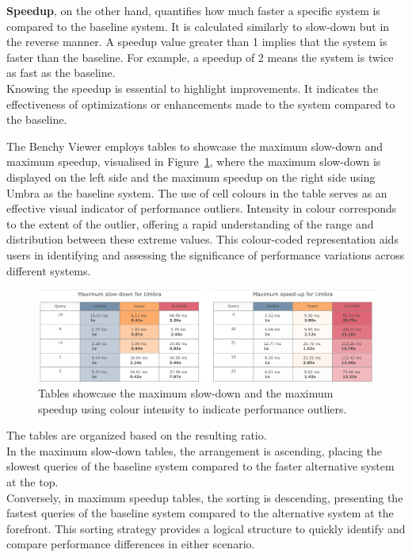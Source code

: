 \textbf{Speedup}, on the other hand, quantifies how much faster a specific system is compared to the baseline system. It is calculated similarly to slow-down but in the reverse manner. A speedup value greater than 1 implies that the system is faster than the baseline. For example, a speedup of 2 means the system is twice as fast as the baseline.\\
Knowing the speedup is essential to highlight improvements. It indicates the effectiveness of optimizations or enhancements made to the system compared to the baseline.

The Benchy Viewer employs tables to showcase the maximum slow-down and maximum speedup, visualised in Figure~\ref{fig:slowdown-speedup-chart}, where the maximum slow-down is displayed on the left side and the maximum speedup on the right side using Umbra as the baseline system. The use of cell colours in the table serves as an effective visual indicator of performance outliers. Intensity in colour corresponds to the extent of the outlier, offering a rapid understanding of the range and distribution between these extreme values. This colour-coded representation aids users in identifying and assessing the significance of performance variations across different systems.

\begin{figure}[h]
  \centering
  \includegraphics[width=1\linewidth]{figures/bsp-table-speedup-slowdown.png}
  \caption{Tables showcase the maximum slow-down and the maximum speedup using colour intensity to indicate performance outliers.}
  \label{fig:slowdown-speedup-chart}
\end{figure}

The tables are organized based on the resulting ratio.\\
In the maximum slow-down tables, the arrangement is ascending, placing the slowest queries of the baseline system compared to the faster alternative system at the top.\\
Conversely, in maximum speedup tables, the sorting is descending, presenting the fastest queries of the baseline system compared to the alternative system at the forefront. This sorting strategy provides a logical structure to quickly identify and compare performance differences in either scenario.

